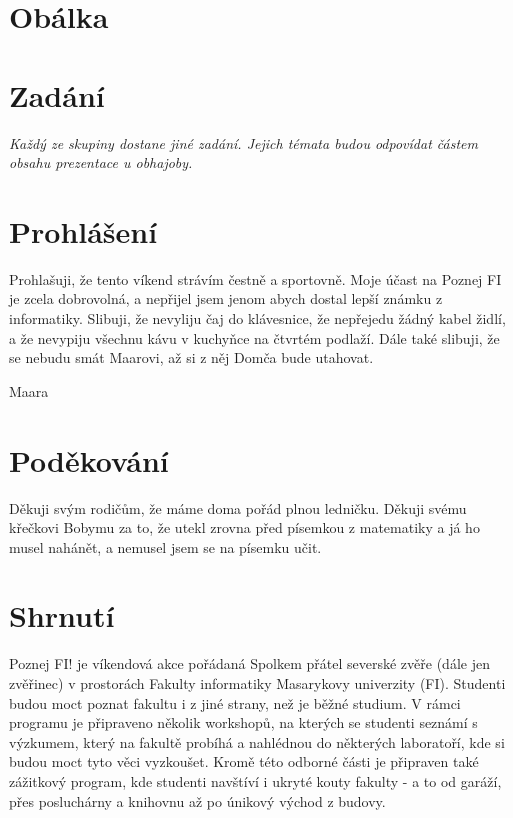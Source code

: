 \documentclass[]{article}
\def \studentname {Maara}
\begin{document}
\pagestyle{empty}


\section*{Obálka}

\pagebreak
\section*{Zadání}

\textit{Každý ze skupiny dostane jiné zadání. Jejich témata budou odpovídat částem obsahu prezentace u obhajoby.}

\pagebreak
\section*{Prohlášení}

Prohlašuji, že tento víkend strávím čestně a sportovně. Moje účast na Poznej FI je zcela dobrovolná, a nepřijel jsem jenom abych dostal lepší známku z informatiky. Slibuji, že nevyliju čaj do klávesnice, že nepřejedu žádný kabel židlí, a že nevypiju všechnu kávu v kuchyňce na čtvrtém podlaží. Dále také slibuji, že se nebudu smát Maarovi, až si z něj Domča bude utahovat.

\vspace{20pt}
\hspace*{\fill}\studentname

\pagebreak
\section*{Poděkování}

Děkuji svým rodičům, že máme doma pořád plnou ledničku. Děkuji svému křečkovi Bobymu za to, že utekl zrovna před písemkou z matematiky a já ho musel nahánět, a nemusel jsem se na písemku učit. 

\pagebreak
\section*{Shrnutí}

Poznej FI! je víkendová akce pořádaná Spolkem přátel severské zvěře (dále jen zvěřinec) v prostorách Fakulty informatiky Masarykovy univerzity (FI). Studenti budou moct poznat fakultu i z jiné strany, než je běžné studium. V rámci programu je připraveno několik workshopů, na kterých se studenti seznámí s výzkumem, který na fakultě probíhá a nahlédnou do některých laboratoří, kde si budou moct tyto věci vyzkoušet. Kromě této odborné části je připraven také zážitkový program, kde studenti navštíví i ukryté kouty fakulty - a to od garáží, přes posluchárny a knihovnu až po únikový východ z budovy.
\end{document}

